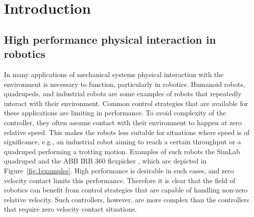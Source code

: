 \documentclass[../DC2017114Bouma.tex]{subfiles}
\begin{document}
\graphicspath{{01_Introduction/img/}}
\renewcommand{\chaptermark}[1]{\markboth{\thechapter.\ #1}{}}
\renewcommand{\sectionmark}[1]{\markright{#1}{}}
\cleartooddpage
\pagestyle{fancyreport}

\chapter{Introduction}\label{ch:intro}
\section{High performance physical interaction in robotics}
In many applications of mechanical systems physical interaction with the environment is necessary to function, particularly in robotics. Humanoid robots, quadrupeds, and industrial robots are some examples of robots that repeatedly interact with their environment. Common control strategies that are available for these applications are limiting in performance. To avoid complexity of the controller, they often assume contact with their environment to happen at zero relative speed. This makes the robots less suitable for situations where speed is of significance, e.g., an industrial robot aiming to reach a certain throughput or a quadruped performing a trotting motion. Examples of such robots the SimLab quadruped \cite{VTquad} and the ABB IRB 360 flexpicker \cite{Flexpicker}, which are depicted in Figure~\ref{fig:1examples}. High performance is desirable in such cases, and zero velocity contact limits this performance. Therefore it is clear that the field of robotics can benefit from control strategies that are capable of handling non-zero relative velocity. Such controllers, however, are more complex than the controllers that require zero velocity contact situations.
\end{document}

